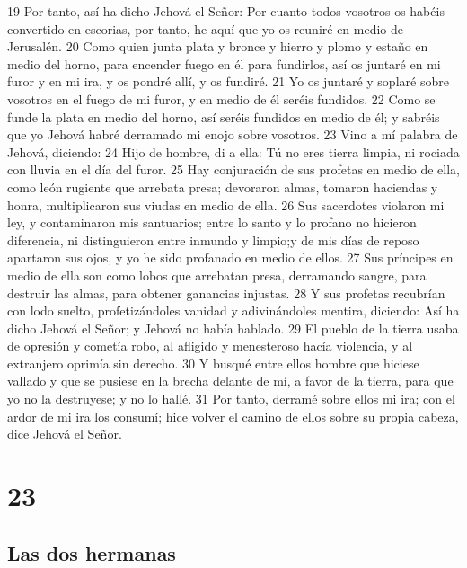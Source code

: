 19 Por tanto, así ha dicho Jehová el Señor: Por cuanto todos vosotros os habéis convertido en escorias, por tanto, he aquí que yo os reuniré en medio de Jerusalén.
20 Como quien junta plata y bronce y hierro y plomo y estaño en medio del horno, para encender fuego en él para fundirlos, así os juntaré en mi furor y en mi ira, y os pondré allí, y os fundiré.
21 Yo os juntaré y soplaré sobre vosotros en el fuego de mi furor, y en medio de él seréis fundidos.
22 Como se funde la plata en medio del horno, así seréis fundidos en medio de él; y sabréis que yo Jehová habré derramado mi enojo sobre vosotros.
23 Vino a mí palabra de Jehová, diciendo:
24 Hijo de hombre, di a ella: Tú no eres tierra limpia, ni rociada con lluvia en el día del furor.
25 Hay conjuración de sus profetas en medio de ella, como león rugiente que arrebata presa; devoraron almas, tomaron haciendas y honra, multiplicaron sus viudas en medio de ella.
26 Sus sacerdotes violaron mi ley, y contaminaron mis santuarios; entre lo santo y lo profano no hicieron diferencia, ni distinguieron entre inmundo y limpio;y de mis días de reposo apartaron sus ojos, y yo he sido profanado en medio de ellos.
27 Sus príncipes en medio de ella son como lobos que arrebatan presa, derramando sangre, para destruir las almas, para obtener ganancias injustas.
28 Y sus profetas recubrían con lodo suelto, profetizándoles vanidad y adivinándoles mentira, diciendo: Así ha dicho Jehová el Señor; y Jehová no había hablado.
29 El pueblo de la tierra usaba de opresión y cometía robo, al afligido y menesteroso hacía violencia, y al extranjero oprimía sin derecho.
30 Y busqué entre ellos hombre que hiciese vallado y que se pusiese en la brecha delante de mí, a favor de la tierra, para que yo no la destruyese; y no lo hallé.
31 Por tanto, derramé sobre ellos mi ira; con el ardor de mi ira los consumí; hice volver el camino de ellos sobre su propia cabeza, dice Jehová el Señor.

\chapter{23}

\section*{Las dos hermanas}

